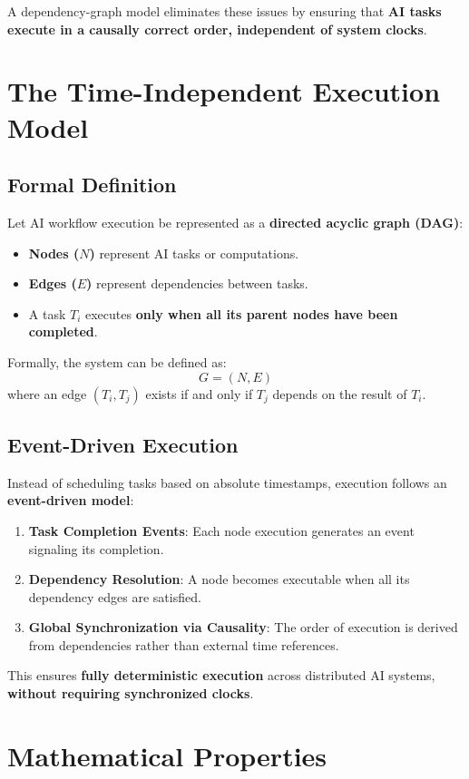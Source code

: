 \documentclass{article}
\begin{document}
A dependency-graph model eliminates these issues by ensuring that \textbf{AI tasks execute in a causally correct order, independent of system clocks}.

\section{The Time-Independent Execution Model}
\subsection{Formal Definition}
Let AI workflow execution be represented as a \textbf{directed acyclic graph (DAG)}:
\begin{itemize}
    \item \textbf{Nodes ($N$)} represent AI tasks or computations.
    \item \textbf{Edges ($E$)} represent dependencies between tasks.
    \item A task $T_i$ executes \textbf{only when all its parent nodes have been completed}.
\end{itemize}

Formally, the system can be defined as:
\[
G = (N, E)
\]
where an edge $(T_i, T_j)$ exists if and only if $T_j$ depends on the result of $T_i$.

\subsection{Event-Driven Execution}
Instead of scheduling tasks based on absolute timestamps, execution follows an \textbf{event-driven model}:
\begin{enumerate}
    \item \textbf{Task Completion Events}: Each node execution generates an event signaling its completion.
    \item \textbf{Dependency Resolution}: A node becomes executable when all its dependency edges are satisfied.
    \item \textbf{Global Synchronization via Causality}: The order of execution is derived from dependencies rather than external time references.
\end{enumerate}

This ensures \textbf{fully deterministic execution} across distributed AI systems, \textbf{without requiring synchronized clocks}.

\section{Mathematical Properties}
\end{document}
